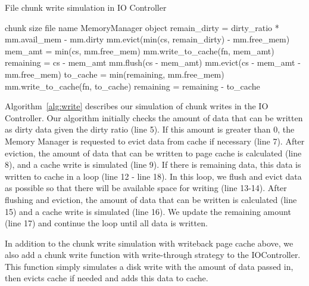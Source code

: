 \documentclass[conference]{IEEEtran}
\newcommand{\Desc}[2]{\State \makebox[2em][l]{#1}#2}
\begin{document}
    \begin{algorithm}\caption{File chunk write simulation in IO Controller}
    \label{alg:write}
        \small
        \begin{algorithmic}[1]
            \Input
                \Desc{cs}{chunk size}
                \Desc{fn}{file name}
                \Desc{mm}{MemoryManager object}
               \EndInput
            \State remain\_dirty = dirty\_ratio * mm.avail\_mem - mm.dirty
             
                \State mm.evict(min(cs, remain\_dirty) - mm.free\_mem)
                \State mem\_amt = min(cs, mm.free\_mem)
                \State mm.write\_to\_cache(fn, mem\_amt) 
            \EndIf
            \State remaining = cs - mem\_amt
              
                \State mm.flush(cs - mem\_amt)
                \State mm.evict(cs - mem\_amt  - mm.free\_mem) 
                \State to\_cache = min(remaining, mm.free\_mem)
                \State mm.write\_to\_cache(fn, to\_cache) 
                \State remaining = remaining - to\_cache
            \EndWhile
            
        \end{algorithmic}
    \end{algorithm}
    Algorithm~\ref{alg:write} describes our simulation of chunk writes in 
    the IO Controller. 
    Our algorithm initially checks the  amount of data that 
    can be written as dirty data given the dirty ratio (line 5).
    If this amount is greater than 0, the Memory Manager is requested to evict 
    data from cache if necessary (line 7).
    After eviction, the amount of data that can be written to 
    page cache is calculated (line 8), and a cache write is simulated (line 9). 
    If there is remaining data, this data is written to cache in a loop (line 12 - line 18).
    In this loop, we flush and evict data as possible so that there will be 
    available space for writing (line 13-14).  
    After flushing and eviction, the amount of data that can be written 
    is calculated (line 15) and a cache write is simulated (line 16). 
    We update the remaining amount (line 17) and continue the loop until all data 
    is written.

    In addition to the chunk write simulation with writeback page cache above, 
    we also add a chunk write function with write-through strategy to the IOController.
    This function simply simulates a disk write with the amount of data passed in, 
    then evicts cache if needed and adds this data to cache. 
    
\end{document}
